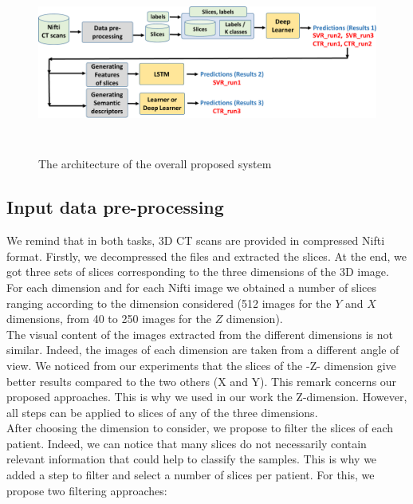 \documentclass{llncs}
\begin{document}
\begin{figure}
\includegraphics[width=\textwidth,height=6cm]{system.pdf}
\caption{The architecture of the overall proposed system} 
\label{fig:system}
\end{figure}


\subsection{Input data pre-processing}
\label{preprocess}
We remind that in both tasks, 3D CT scans are provided in compressed Nifti format. Firstly, we decompressed the files and extracted the slices. At the end, we got three sets of slices corresponding to the three dimensions of the 3D image. For each dimension and for each Nifti image we obtained a number of slices ranging according to the dimension considered (512 images for the $Y$ and $X$ dimensions, from 40 to 250 images for the $Z$ dimension).\\

The visual content of the images extracted from the different dimensions is not similar. Indeed, the images of each dimension are taken from a different angle of view. We noticed from our experiments that the slices of the -Z- dimension give better results compared to the two others (X and Y). This remark concerns our proposed approaches. This is why we used in our work the Z-dimension. However, all steps can be applied to slices of any of the three dimensions.\\

After choosing the dimension to consider, we propose to filter the slices of each patient. Indeed, we can notice that many slices do not necessarily contain relevant information that could help to classify the samples. This is why we added a step to filter and select a number of slices per patient. For this, we propose two filtering approaches:\\
\end{document}
